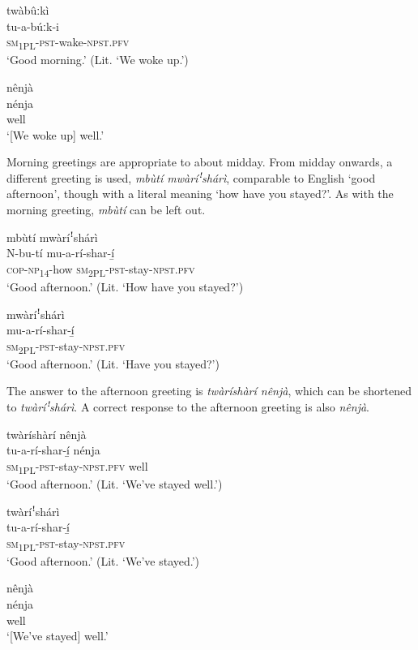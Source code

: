 \ea
\glll twàbûːkì  \\
tu-a-búːk-i\\
\textsc{sm}\textsubscript{1PL}{}-\textsc{pst}{}-wake-\textsc{npst}.\textsc{pfv}\\
\glt ‘Good morning.’ (Lit. ‘We woke up.’)
\z


\ea
\glll nênjà\\
nénja\\
well\\
\glt ‘[We woke up] well.’
\z


Morning greetings are appropriate to about midday. From midday onwards, a different greeting is used, \textit{mbùtí mwàríꜝshárì}, comparable to English ‘good afternoon’, though with a literal meaning ‘how have you stayed?’. As with the morning greeting, \textit{mbùtí} can be left out.


\ea
mbùtí mwàríꜝshárì\\
\gll N-bu-tí    mu-a-rí-shar-í̲\\
\textsc{cop}{}-\textsc{np}\textsubscript{14}{}-how  \textsc{sm}\textsubscript{2PL}{}-\textsc{pst}{}-stay-\textsc{npst}.\textsc{pfv}\\
\glt ‘Good afternoon.’ (Lit. ‘How have you stayed?’)
\z


\ea
\glll mwàríꜝshárì\\
mu-a-rí-shar-í̲\\
\textsc{sm}\textsubscript{2PL}{}-\textsc{pst}{}-stay-\textsc{npst}.\textsc{pfv}\\
\glt ‘Good afternoon.’ (Lit. ‘Have you stayed?’)
\z


The answer to the afternoon greeting is \textit{twàríshàrí nênjà}, which can be shortened to \textit{twàríꜝ}\textit{shárì}. A correct response to the afternoon greeting is also \textit{nênjà}.


\ea
twàríshàrí nênjà\\
\gll tu-a-rí-shar-í̲    nénja\\
\textsc{sm}\textsubscript{1PL}{}-\textsc{pst}{}-stay-\textsc{npst}.\textsc{pfv}  well\\
\glt ‘Good afternoon.’ (Lit. ‘We’ve stayed well.’)
\z


\ea
\glll twàríꜝshárì\\
tu-a-rí-shar-í̲\\
\textsc{sm}\textsubscript{1PL}{}-\textsc{pst}{}-stay-\textsc{npst}.\textsc{pfv}\\
\glt ‘Good afternoon.’ (Lit. ‘We’ve stayed.’)
\z


\ea
\glll nênjà\\
nénja\\
well\\
\glt ‘[We’ve stayed] well.’
\z


